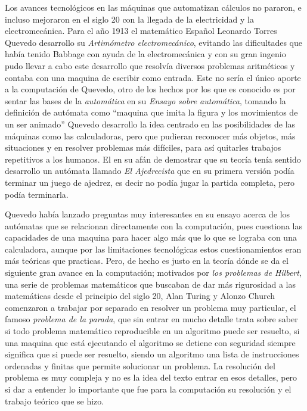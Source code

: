 \documentclass[letterpaper,12pt,oneside]{book}
\begin{document}
		Los avances tecnológicos en las máquinas que automatizan cálculos no pararon, e incluso mejoraron en el siglo 20 con la llegada de la electricidad
		y la electromecánica. Para el año 1913 el matemático Español Leonardo Torres Quevedo desarrollo su \textit{Artimómetro electromecánico}, evitando las
		dificultades que había tenido Babbage con ayuda de la electromecánica y con su gran ingenio pudo llevar a cabo este desarrollo que resolvía diversos
		problemas aritméticos y contaba con una maquina de escribir como entrada. Este no sería el único aporte
		a la computación de Quevedo, otro de los hechos por los que es conocido es por sentar las bases de la \textit{automática} en su \textit{Ensayo sobre automática}, 
		tomando
		la definición de autómata como ``maquina que imita la figura y los movimientos de un ser animado'' Quevedo desarrollo la idea centrado en las posibilidades
		de las máquinas como las calculadoras, pero que pudieran reconocer más objetos, más situaciones y en resolver problemas más difíciles, para así
		quitarles trabajos repetitivos a los humanos. El en su afán de demostrar que su teoría tenía sentido desarrollo un autómata llamado
		\textit{El Ajedrecista} que en su primera versión podía terminar un juego de ajedrez, es decir no podía jugar la partida completa,
		pero podía terminarla\cite{museo_torres_quevedo_ajedrecista_nodate,ifrah_universal_2001}.
		
		Quevedo había lanzado preguntas muy interesantes en su ensayo acerca de los autómatas que se relacionan directamente con la computación, pues cuestiona
		las capacidades de una maquina para hacer algo más que lo que se lograba con una calculadora, aunque por las limitaciones tecnológicas estos cuestionamientos
		eran más teóricas que practicas. Pero, de hecho es justo en la teoría dónde se da el siguiente gran avance en la computación; motivados por \textit{los problemas
		de Hilbert}, una serie de problemas matemáticos que buscaban de dar más rigurosidad a las matemáticas desde el principio del siglo 20, Alan Turing
		y Alonzo Church comenzaron a trabajar por separado en resolver un problema muy particular, el famoso \textit{problema de la parada}, que sin entrar en mucho
		detalle trata sobre saber si todo problema matemático reproducible en un algoritmo puede ser resuelto, si una maquina que está ejecutando el algoritmo
		se detiene con seguridad siempre significa que si puede ser resuelto, siendo un algoritmo una lista de instrucciones ordenadas y finitas que permite solucionar un 
		problema. La resolución
		del problema es muy compleja y no es la idea del texto entrar en esos detalles, pero si dar a entender lo importante que fue para la computación su resolución
		y el trabajo teórico que se hizo.
		
\end{document}
